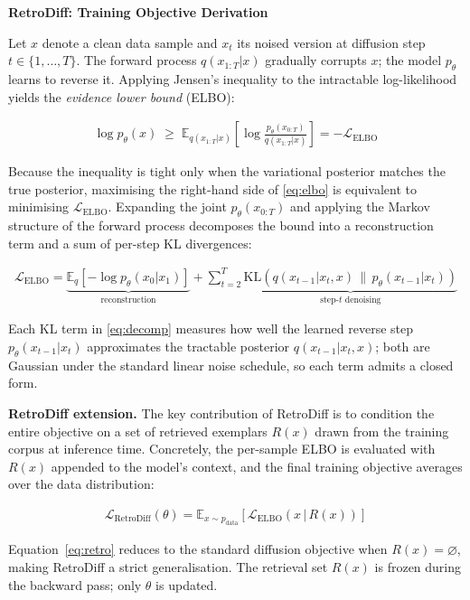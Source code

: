 \documentclass[11pt]{article}
\begin{document}
\begin{center}
  {\large\bfseries RetroDiff: Training Objective Derivation}
\end{center}

\medskip

\noindent
Let $x$ denote a clean data sample and $x_t$ its noised version at diffusion step $t \in \{1,\ldots,T\}$.
The forward process $q(x_{1:T}|x)$ gradually corrupts $x$; the model $p_\theta$ learns to reverse it.
Applying Jensen's inequality to the intractable log-likelihood yields the \emph{evidence lower bound} (ELBO):

\begin{align}
  \log p_\theta(x) \;\geq\;
  \mathbb{E}_{q(x_{1:T}|x)}\!\left[\log\frac{p_\theta(x_{0:T})}{q(x_{1:T}|x)}\right]
  = -\mathcal{L}_{\mathrm{ELBO}}
  \label{eq:elbo}
\end{align}

\noindent
Because the inequality is tight only when the variational posterior matches the true posterior,
maximising the right-hand side of \eqref{eq:elbo} is equivalent to minimising
$\mathcal{L}_{\mathrm{ELBO}}$.
Expanding the joint $p_\theta(x_{0:T})$ and applying the Markov structure of the forward process
decomposes the bound into a reconstruction term and a sum of per-step KL divergences:

\begin{align}
  \mathcal{L}_{\mathrm{ELBO}}
  = \underbrace{\mathbb{E}_q\!\left[-\log p_\theta(x_0|x_1)\right]}_{\text{reconstruction}}
  + \sum_{t=2}^{T}
    \underbrace{\mathrm{KL}\!\left(q(x_{t-1}|x_t,x) \,\|\, p_\theta(x_{t-1}|x_t)\right)}_{\text{step-}t\text{ denoising}}
  \label{eq:decomp}
\end{align}

\noindent
Each KL term in \eqref{eq:decomp} measures how well the learned reverse step $p_\theta(x_{t-1}|x_t)$
approximates the tractable posterior $q(x_{t-1}|x_t,x)$; both are Gaussian under the standard
linear noise schedule, so each term admits a closed form.

\medskip
\noindent\textbf{RetroDiff extension.}\quad
The key contribution of RetroDiff is to condition the entire objective on a set of retrieved exemplars
$R(x)$ drawn from the training corpus at inference time.
Concretely, the per-sample ELBO is evaluated with $R(x)$ appended to the model's context,
and the final training objective averages over the data distribution:

\begin{align}
  \mathcal{L}_{\mathrm{RetroDiff}}(\theta)
  = \mathbb{E}_{x \sim p_{\mathrm{data}}}\!\left[
      \mathcal{L}_{\mathrm{ELBO}}\!\left(x \,\big|\, R(x)\right)
    \right]
  \label{eq:retro}
\end{align}

\noindent
Equation~\eqref{eq:retro} reduces to the standard diffusion objective when $R(x) = \varnothing$,
making RetroDiff a strict generalisation.
The retrieval set $R(x)$ is frozen during the backward pass; only $\theta$ is updated.
\end{document}
